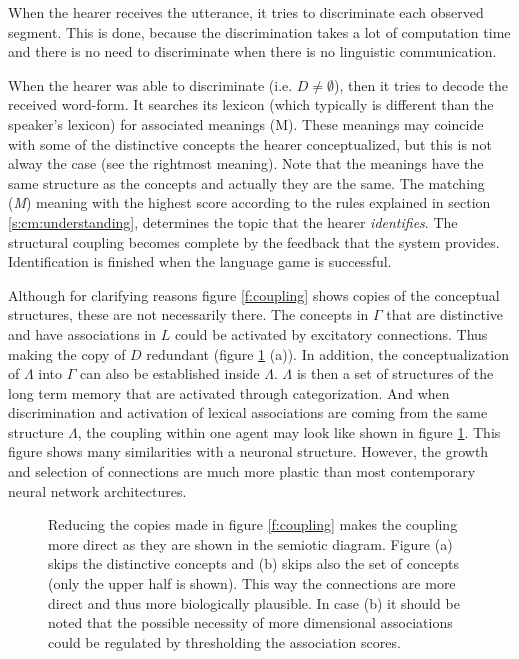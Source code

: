 When the hearer receives the utterance, it tries to discriminate each observed segment. This is done, because the discrimination takes a lot of computation time and there is no need to discriminate when there is no linguistic communication. 

When the hearer was able to discriminate (i.e. $D \neq \emptyset$), then it tries to decode the received word-form. It searches its lexicon (which typically is different than the speaker's lexicon) for associated meanings (M). These meanings may coincide with some of the distinctive concepts the hearer conceptualized, but this is not alway the case (see the rightmost meaning). Note that the meanings have the same structure as the concepts and actually they are the same. The matching ({\it M}) meaning with the highest score according to the rules explained in section \ref{s:cm:understanding}, determines the topic that the hearer {\em identifies}. The structural coupling becomes complete by the feedback that the system provides. Identification is finished when the language game is successful.

\p
Although for clarifying reasons figure \ref{f:coupling} shows copies of the conceptual structures, these are not necessarily there. The concepts in $\Gamma$ that are distinctive and have associations in $L$ could be activated by excitatory connections. Thus making the copy of $D$ redundant (figure \ref{f:cm:excitation} (a)). In addition, the conceptualization of $\Lambda$ into $\Gamma$ can also be established inside $\Lambda$. $\Lambda$ is then a set of structures of the long term memory that are activated through categorization. And when discrimination and activation of lexical associations are coming from the same structure $\Lambda$, the coupling within one agent may look like shown in figure \ref{f:cm:excitation}. This figure shows many similarities with a neuronal structure. However, the growth and selection of connections are much more plastic than most contemporary neural network architectures.

\begin{figure}[t]
\end{figure}
\begin{figure}
\caption{Reducing the copies made in figure \ref{f:coupling} makes the coupling more direct as they are shown in the semiotic diagram. Figure (a) skips the distinctive concepts and (b) skips also the set of concepts (only the upper half is shown). This way the connections are more direct and thus more biologically plausible. In case (b) it should be noted that the possible necessity of more dimensional associations could be regulated by thresholding the association scores.}
\label{f:cm:excitation}
\end{figure}

